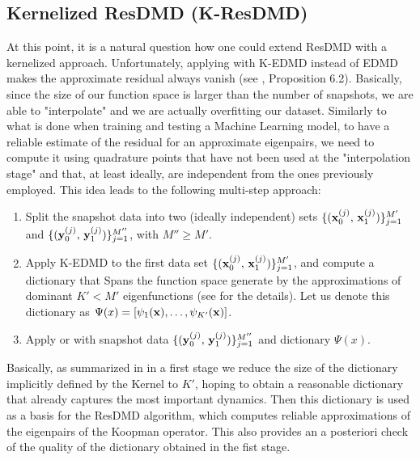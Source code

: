 \subsection{Kernelized ResDMD (K-ResDMD)}
At this point, it is a natural question how one could extend ResDMD with a kernelized approach. Unfortunately, applying  with K-EDMD instead of EDMD makes the approximate residual always vanish (see \cite{colbrook_rigorous_2021}, Proposition 6.2). Basically, since the size of our function space is larger than the number of snapshots, we are able to "interpolate" and we are actually overfitting our dataset. Similarly to what is done when training and testing a Machine Learning model, to have a reliable estimate of the residual for an approximate eigenpairs, we need to compute it using quadrature points that have not been used at the "interpolation stage" and that, at least ideally, are independent from the ones previously employed. This idea leads to the following multi-step approach:
\begin{enumerate}
    \item Split the snapshot data into two (ideally independent) sets $\{(\vb{x}_0^{(j)},\,\vb{x}_1^{(j)})\}_{j=1}^{M'}$ and  $\{(\vb{y}_0^{(j)},\,\vb{y}_1^{(j)})\}_{j=1}^{M''}$, with $M'' \geq M'$.
    \item Apply K-EDMD to the first data set $\{(\vb{x}_0^{(j)},\,\vb{x}_1^{(j)})\}_{j=1}^{M'}$, and compute a dictionary that Spans the function space generate by the approximations of dominant $K' < M'$ eigenfunctions (see  for the details). Let us denote this dictionary as $\Psi(x) = \left[\psi_1(\vb{x}), \dots, \psi_{K'}(\vb{x})\right]$.
    \item Apply  or  with snapshot data $\{(\vb{y}_0^{(j)},\,\vb{y}_1^{(j)})\}_{j=1}^{M''}$ and dictionary $\Psi(x)$.
\end{enumerate}
Basically, as summarized in  in a first stage we reduce the size of the dictionary implicitly defined by the Kernel to $K'$, hoping to obtain a reasonable dictionary that already captures the most important dynamics. Then this dictionary is used as a basis for the ResDMD algorithm, which computes reliable approximations of the eigenpairs of the Koopman operator. This also provides an a posteriori check of the quality of the dictionary obtained in the fist stage.

